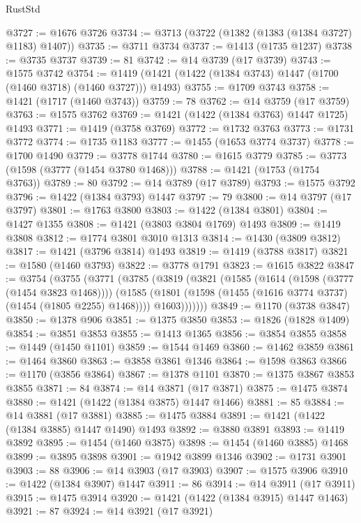 \begin{lexlean}{RustStd}
\begin{coremodule}
@3727 := @1676 @3726
@3734 := @3713 (@3722 (@1382 (@1383 (@1384 @3727) @1183) @1407))
@3735 := @3711 @3734
@3737 := @1413 (@1735 @1237)
@3738 := @3735 @3737
@3739 := 81
@3742 := @14 @3739 (@17 @3739)
@3743 := @1575 @3742
@3754 := @1419 (@1421 (@1422 (@1384 @3743) @1447 (@1700 (@1460 @3718) (@1460 @3727))) @1493)
@3755 := @1709 @3743
@3758 := @1421 (@1717 (@1460 @3743))
@3759 := 78
@3762 := @14 @3759 (@17 @3759)
@3763 := @1575 @3762
@3769 := @1421 (@1422 (@1384 @3763) @1447 @1725) @1493
@3771 := @1419 (@3758 @3769)
@3772 := @1732 @3763
@3773 := @1731 @3772
@3774 := @1735 @1183
@3777 := @1455 (@1653 @3774 @3737)
@3778 := @1700 @1490
@3779 := @3778 @1744
@3780 := @1615 @3779
@3785 := @3773 (@1598 (@3777 (@1454 @3780 @1468)))
@3788 := @1421 (@1753 (@1754 @3763))
@3789 := 80
@3792 := @14 @3789 (@17 @3789)
@3793 := @1575 @3792
@3796 := @1422 (@1384 @3793) @1447
@3797 := 79
@3800 := @14 @3797 (@17 @3797)
@3801 := @1763 @3800
@3803 := @1422 (@1384 @3801)
@3804 := @1427 @1355
@3808 := @1421 (@3803 @3804 @1769) @1493
@3809 := @1419 @3808
@3812 := @1774 @3801 @3010 @1313
@3814 := @1430 (@3809 @3812)
@3817 := @1421 (@3796 @3814) @1493
@3819 := @1419 (@3788 @3817)
@3821 := @1580 (@1460 @3793)
@3822 := @3778 @1791
@3823 := @1615 @3822
@3847 := @3754
    (@3755
      (@3771
        (@3785
          (@3819
            (@3821
              (@1585
                (@1614 (@1598 (@3777 (@1454 @3823 @1468))))
                (@1585
                  (@1801 (@1598 (@1455 (@1616 @3774 @3737) (@1454 (@1805 @2255) @1468))))
                  @1603)))))))
@3849 := @1170 (@3738 @3847)
@3850 := @1378 @906
@3851 := @1375 @3850
@3853 := @1826 (@1828 @1409)
@3854 := @3851 @3853
@3855 := @1413 @1365
@3856 := @3854 @3855
@3858 := @1449 (@1450 @1101)
@3859 := @1544 @1469
@3860 := @1462 @3859
@3861 := @1464 @3860
@3863 := @3858 @3861 @1346
@3864 := @1598 @3863
@3866 := @1170 (@3856 @3864)
@3867 := @1378 @1101
@3870 := @1375 @3867 @3853 @3855
@3871 := 84
@3874 := @14 @3871 (@17 @3871)
@3875 := @1475 @3874
@3880 := @1421 (@1422 (@1384 @3875) @1447 @1466)
@3881 := 85
@3884 := @14 @3881 (@17 @3881)
@3885 := @1475 @3884
@3891 := @1421 (@1422 (@1384 @3885) @1447 @1490) @1493
@3892 := @3880 @3891
@3893 := @1419 @3892
@3895 := @1454 (@1460 @3875)
@3898 := @1454 (@1460 @3885) @1468
@3899 := @3895 @3898
@3901 := @1942 @3899 @1346
@3902 := @1731 @3901
@3903 := 88
@3906 := @14 @3903 (@17 @3903)
@3907 := @1575 @3906
@3910 := @1422 (@1384 @3907) @1447
@3911 := 86
@3914 := @14 @3911 (@17 @3911)
@3915 := @1475 @3914
@3920 := @1421 (@1422 (@1384 @3915) @1447 @1463)
@3921 := 87
@3924 := @14 @3921 (@17 @3921)

\end{coremodule}
\end{lexlean}
